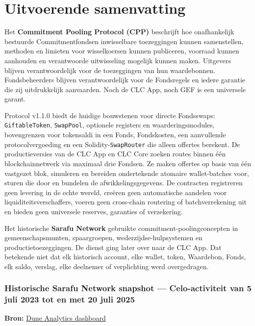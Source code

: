 \documentclass[11pt]{article}
\begin{document}
\section*{Uitvoerende samenvatting}

Het \textbf{Commitment Pooling Protocol (CPP)} beschrijft hoe onafhankelijk bestuurde Commitmentfondsen inwisselbare toezeggingen kunnen samenstellen, methoden en limieten voor wisselkoersen kunnen publiceren, voorraad kunnen aanhouden en verantwoorde uitwisseling mogelijk kunnen maken. Uitgevers blijven verantwoordelijk voor de toezeggingen van hun waardebonnen. Fondsbeheerders blijven verantwoordelijk voor de Fondsregels en iedere garantie die zij uitdrukkelijk aanvaarden. Noch de CLC App, noch GEF is een universele garant.

Protocol v1.1.0 biedt de huidige bouwstenen voor directe Fondsswaps: \texttt{GiftableToken}, \texttt{SwapPool}, optionele registers en waarderingsmodules, bovengrenzen voor tokensaldi in een Fonds, Fondskosten, een aanvullende protocolvergoeding en een Solidity-\texttt{SwapRouter} die alleen offertes berekent. De productieversies van de CLC App en CLC Core zoeken routes binnen één blockchainnetwerk via maximaal drie Fondsen. Ze maken offertes op basis van één vastgezet blok, simuleren en bereiden ondertekende atomaire wallet-batches voor, sturen die door en bundelen de afwikkelingsgegevens. De contracten registreren geen levering in de echte wereld, creëren geen automatische aandelen voor liquiditeitsverschaffers, voeren geen cross-chain routering of batchverrekening uit en bieden geen universele reserves, garanties of verzekering.

Het historische \textbf{Sarafu Network} gebruikte commitment-poolingconcepten in gemeenschapsmunten, spaargroepen, wederzijdse-hulpsystemen en productietoezeggingen. De dienst ging later over naar de CLC App. Dat betekende niet dat elk historisch account, elke wallet, token, Waardebon, Fonds, elk saldo, verslag, elke deelnemer of verplichting werd overgedragen.

\subsubsection*{Historische Sarafu Network snapshot --- Celo-activiteit van 5 juli 2023 tot en met 20 juli 2025}

\textbf{Bron:} \href{https://dune.com/grassrootseconomics/sarafu-network}{Dune Analytics dashboard}
\end{document}
